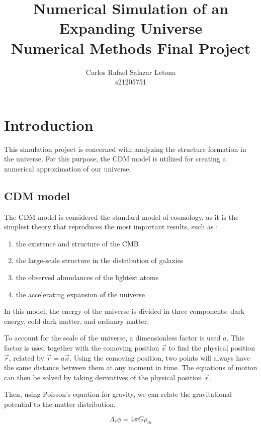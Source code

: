 \documentclass[12pt]{article}
\begin{document}
\title{Numerical Simulation of an Expanding Universe \\ Numerical Methods Final Project}
\author{Carlos Rafael Salazar Letona \\ s21205751}
\maketitle

\section*{Introduction}
This simulation project is concerned with analyzing the structure formation in the universe. For this purpose, the \Lambda CDM model is utilized for creating a numerical approximation of our universe.

\subsection*{\Lambda CDM model}
The \Lambda CDM model is considered the standard model of cosmology, as it is the simplest theory that reproduces the most important results, such as \cite{ref:lambdacdm}:

\begin{enumerate}
\item the existence and structure of the CMB
\item the large-scale structure in the distribution of galaxies
\item the observed abundances of the lightest atoms
\item the accelerating expansion of the universe
\end{enumerate}
In this model, the energy of the universe is divided in three components: dark energy, cold dark matter, and ordinary matter.

To account for the scale of the universe, a dimensionless factor is used $a$. This factor is used together with the comoving position $\vec{x}$ to find the physical position $\vec{r}$, related by $\vec{r} = a \vec{x}$. Using the comoving position, two points will always have the same distance between them at any moment in time. The equations of motion can then be solved by taking derivatives of the physical position $\vec{r}$.

Then, using Poisson's equation for gravity, we can relate the gravitational potential to the matter distribution.

\begin{equation}
\Lambda_{r} \phi = 4 \pi G \rho_{m}
\end{equation}
\end{document}
